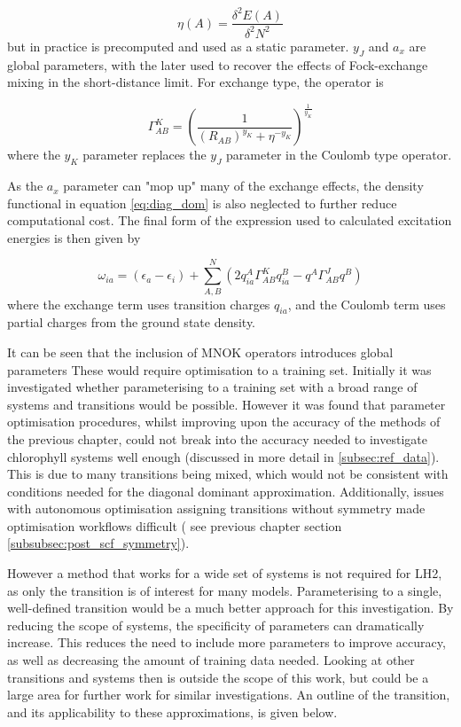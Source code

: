 \begin{equation}
\eta\left(A\right) = \frac{\delta^2 E\left(A\right)}{\delta^2 N^2}
\end{equation}
%
but in practice is precomputed and used as a static parameter. $y_J$ and $a_x$ are
global parameters, with the later used to recover the effects of Fock-exchange mixing
in the short-distance limit. For exchange type, the operator is

\begin{equation}
\Gamma^K_{AB} = \left(\frac{1}{\left(R_{AB}\right)^{y_K} + \eta^{-y_K}} \right)^{\frac{1}{y_K}}
\end{equation}
%
where the $y_K$ parameter replaces the $y_J$ parameter in the Coulomb type operator.

As the $a_x$ parameter can "mop up" many of the exchange effects, the density functional
in equation \ref{eq:diag_dom} is also neglected to further reduce computational cost.
The final form of the expression used to calculated excitation energies is then 
given by

\begin{equation}
\omega_{ia} = \left(\epsilon_a - \epsilon_i\right) + \sum^N_{A,B}\left(2 q_{ia}^A \Gamma^K_{AB} q_{ia}^B - q^A \Gamma^J_{AB} q^B\right)
\end{equation}
%
where the exchange term uses transition charges $q_{ia}$, and the Coulomb term uses
partial charges from the ground state density.

It can be seen that the inclusion of MNOK operators introduces global parameters
These would require optimisation to a training set. Initially it was investigated
whether parameterising to a training set with a broad range of systems and transitions
would be possible. However it was found that parameter optimisation procedures, 
whilst improving upon the accuracy of the \dxtb methods of the previous chapter,
could not break into the accuracy needed to investigate chlorophyll systems well
enough (discussed in more detail in \ref{subsec:ref_data}). This is due to many
transitions being mixed, which would not be consistent with conditions needed for
the diagonal dominant approximation. Additionally, issues with autonomous optimisation
assigning transitions without symmetry made optimisation workflows difficult (
see previous chapter section \ref{subsubsec:post_scf_symmetry}).

However a method that works for a wide set of systems is not required for LH2,
as only the \Qy transition is of interest for many models. Parameterising to a 
single, well-defined transition would be a much better approach for this investigation.
By reducing the scope of systems, the specificity of parameters can dramatically increase. 
This reduces the need to include more parameters to improve accuracy, as well as 
decreasing the amount of training data needed. Looking at other transitions and
systems then is outside the scope of this work, but could be a large area for further
work for similar investigations. An outline of the \Qy transition, and its applicability
to these approximations, is given below.

